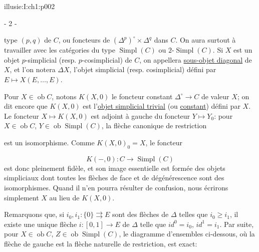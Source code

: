 \IllusieSetPhysicalPageSize{447bp}{698.6bp}
\begin{illusiebodypage}{illusie:I:ch1:p002}
\begin{center}- 2 -\end{center}
\vspace{8bp}\fontsize{9}{14}\selectfont

\hypertarget{illusie:I:ch1:s1:1:p2c1}{}%
\noindent type $(p,q)$ de $C$, ou foncteurs de
$(\Delta^p)^{\circ}\times\Delta^q$ dans $C$. On aura surtout à travailler avec
les catégories du type $\operatorname{Simpl}(C)$ ou
$2\text{-}\operatorname{Simpl}(C)$. Si $X$ est un objet $p$-simplicial (resp.
$p$-cosimplicial) de $C$, on appellera \underline{sous-objet diagonal} de $X$,
et l'on notera $\Delta X$, l'objet simplicial (resp. cosimplicial) défini par
$E\longmapsto X(E,\ldots,E)$.

\hypertarget{illusie:I:ch1:s1:1:p3}{}%
Pour $X\in\operatorname{ob}C$, notons $K(X,0)$ le foncteur constant
$\Delta^{\circ}\longrightarrow C$ de valeur $X$; on dit encore que $K(X,0)$
est l'\underline{objet simplicial trivial} (ou \underline{constant}) défini par
$X$. Le foncteur $X\longmapsto K(X,0)$ est adjoint à gauche du foncteur
$Y\longmapsto Y_0$: pour $X\in\operatorname{ob}C$,
$Y\in\operatorname{ob}\operatorname{Simpl}(C)$, la flèche canonique de
restriction

\hypertarget{illusie:I:ch1:s1:1:eq2}{}%
\noindent{}\par

est un isomorphisme. Comme $K(X,0)_0=X$, le foncteur

\hypertarget{illusie:I:ch1:s1:1:d3}{}%
\[
  K(-,0):C\longrightarrow\operatorname{Simpl}(C)
\]
est donc pleinement fidèle, et son image essentielle est formée des objets
simpliciaux dont toutes les flèches de face et de dégénérescence sont des
isomorphismes. Quand il n'en pourra résulter de confusion, nous écrirons
simplement $X$ au lieu de $K(X,0)$.

\hypertarget{illusie:I:ch1:s1:1:p4}{}%
Remarquons que, si $i_0,i_1:\{0\}\rightrightarrows E$ sont des flèches de
$\Delta$ telles que $i_0\geq i_1$, il existe une unique flèche
$i:[0,1]\longrightarrow E$ de $\Delta$ telle que $i d^0=i_0$, $i d^1=i_1$.
Par suite, pour $X\in\operatorname{ob}C$,
$Z\in\operatorname{ob}\operatorname{Simpl}(C)$, le diagramme d'ensembles
ci-dessous, où la flèche de gauche est la flèche naturelle de restriction,
est exact:


\end{illusiebodypage}
